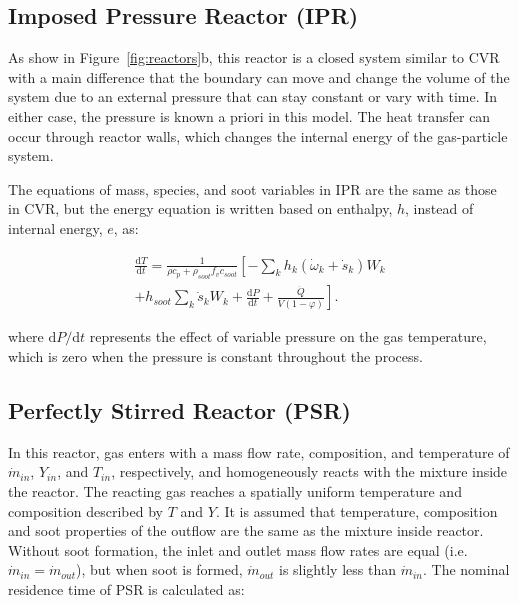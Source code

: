 \subsection{Imposed Pressure Reactor (IPR)}

As show in Figure~\ref{fig:reactors}b, this reactor is a closed system similar to CVR with a main difference that the boundary can move and change the volume of the system due to an external pressure that can stay constant or vary with time. In either case, the pressure is known a priori in this model. The heat transfer can occur through reactor walls, which changes the internal energy of the gas-particle system.

The equations of mass, species, and soot variables in IPR are the same as those in CVR, but the energy equation is written based on enthalpy, $h$, instead of internal energy, $e$, as:

\begin{equation}
	\begin{split}
		\frac{\mathrm{d} T}{\mathrm{d} t}=
		\frac{1}{\rho c_p+\rho_{soot}f_v c_{soot}}
		\left[
		-\sum_k h_k
		\left(
		\dot{\omega}_k+\dot{s}_k
		\right) W_k \right. \\
		\left.
		+h_{soot}\sum_k \dot{s}_k W_k
		+\frac{\mathrm{d}P}{\mathrm{d}t}
		+\frac{\dot{Q}}{V(1-\varphi)}
		\right]
		\label{eqn:energypressure}.
	\end{split}
\end{equation}


\noindent where $\mathrm{d}P/\mathrm{d}t$ represents the effect of variable pressure on the gas temperature, which is zero when the pressure is constant throughout the process.


\subsection{Perfectly Stirred Reactor (PSR)}
In this reactor, gas enters with a mass flow rate, composition, and temperature of $\dot{m}_{in}$, $Y_{in}$, and $T_{in}$, respectively, and homogeneously reacts with the mixture inside the reactor. The reacting gas reaches a spatially uniform temperature and composition described by $T$ and $Y$. It is assumed that temperature, composition and soot properties of the outflow are the same as the mixture inside reactor. Without soot formation, the inlet and outlet mass flow rates are equal (i.e. ${\dot{m}_{in}}={\dot{m}_{out}}$), but when soot is formed, ${\dot{m}_{out}}$ is slightly less than ${\dot{m}_{in}}$. The nominal residence time of PSR is calculated as:

